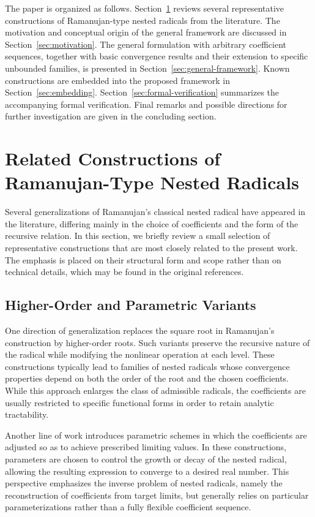 \documentclass[11pt,a4paper]{amsart}
\theoremstyle{plain}
\theoremstyle{definition}
\theoremstyle{remark}
\begin{document}
The paper is organized as follows. Section~\ref{sec:related} reviews several representative constructions of Ramanujan-type nested radicals from the literature. The motivation and conceptual origin of the general framework are discussed in Section~\ref{sec:motivation}. The general formulation with arbitrary coefficient sequences, together with basic convergence results and their extension to specific unbounded families, is presented in Section~\ref{sec:general-framework}. Known constructions are embedded into the proposed framework in Section~\ref{sec:embedding}. Section~\ref{sec:formal-verification} summarizes the accompanying formal verification. Final remarks and possible directions for further investigation are given in the concluding section.

\section{Related Constructions of Ramanujan-Type Nested Radicals}
\label{sec:related}

Several generalizations of Ramanujan’s classical nested radical have appeared in the literature, differing mainly in the choice of coefficients and the form of the recursive relation. In this section, we briefly review a small selection of representative constructions that are most closely related to the present work. The emphasis is placed on their structural form and scope rather than on technical details, which may be found in the original references.

\subsection{Higher-Order and Parametric Variants}
\label{subsec:higher-order-parametric}

One direction of generalization replaces the square root in Ramanujan’s construction by higher-order roots. Such variants preserve the recursive nature of the radical while modifying the nonlinear operation at each level. These constructions typically lead to families of nested radicals whose convergence properties depend on both the order of the root and the chosen coefficients. While this approach enlarges the class of admissible radicals, the coefficients are usually restricted to specific functional forms in order to retain analytic tractability.

Another line of work introduces parametric schemes in which the coefficients are adjusted so as to achieve prescribed limiting values. In these constructions, parameters are chosen to control the growth or decay of the nested radical, allowing the resulting expression to converge to a desired real number. This perspective emphasizes the inverse problem of nested radicals, namely the reconstruction of coefficients from target limits, but generally relies on particular parameterizations rather than a fully flexible coefficient sequence.
\end{document}
